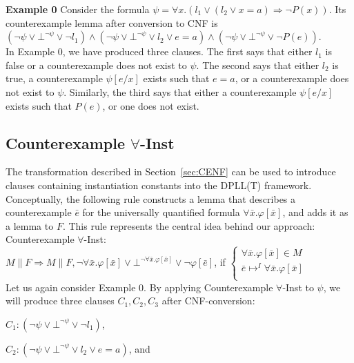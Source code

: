 \documentclass{llncs}
\begin{document}
{\bf Example 0}
Consider the formula $\psi = \forall x. ( l_1 \vee ( l_2 \vee x = a ) \Rightarrow \neg P( x ) )$.
Its counterexample lemma after conversion to CNF is $( \neg \psi \vee \bot^{\neg \psi} \vee \neg l_1 ) \wedge ( \neg \psi \vee \bot^{\neg \psi} \vee l_2 \vee e = a ) \wedge ( \neg \psi \vee \bot^{\neg \psi} \vee \neg P( e ) ) $. \\

In Example 0, we have produced three clauses.
The first says that either $l_1$ is false or a counterexample does not exist to $\psi$.
The second says that either $l_2$ is true, a counterexample $\psi[e/x]$ exists such that $e = a$, or a counterexample does not exist to $\psi$. 
Similarly, the third says that either a counterexample $\psi[e/x]$ exists such that $P( e )$, or one does not exist.

\subsection{Counterexample $\forall$-Inst}

The transformation described in Section~\ref{sec:CENF} can be used to introduce clauses containing instantiation constants into the DPLL(T) framework.
Conceptually, the following rule constructs a lemma that describes a counterexample $\bar{e}$ for the universally quantified formula $\forall \bar{x}. \varphi[ \bar{ x } ]$, and adds it as a lemma to $F$.
This rule represents the central idea behind our approach: \\

\noindent Counterexample $\forall$-Inst: \\

$M \parallel F \Longrightarrow M \parallel F, \neg \forall \bar{x}. \varphi[ \bar{x} ] \vee \bot^{\neg \forall \bar{x}. \varphi[ \bar{x} ]} \vee \neg \varphi[ \bar{ e } ]$, if   
$\begin{cases}
  \forall \bar{x}. \varphi[ \bar{ x } ] \in M \\
  \bar{ e } \mapsto^I \forall \bar{x}. \varphi[ \bar{ x } ] \\
\end{cases}$ \\

Let us again consider Example 0.
By applying Counterexample $\forall$-Inst to $\psi$, we will produce three clauses $C_1, C_2, C_3$ after CNF-conversion:

$C_1 : ( \neg \psi \vee \bot^{\neg \psi} \vee \neg l_1 )$,

$C_2 : ( \neg \psi \vee \bot^{\neg \psi} \vee l_2 \vee e = a )$, and
\end{document}
